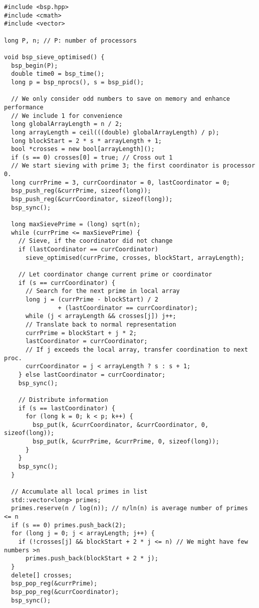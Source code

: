 \documentclass[a4paper,12pt]{article}
\begin{document}
	\begin{lstlisting}[caption={Optimised parallel program for the Sieve of Eratosthenes}, label={prg:par_opt_sieve}, frame={single}]
#include <bsp.hpp>
#include <cmath>
#include <vector>

long P, n; // P: number of processors

void bsp_sieve_optimised() {
  bsp_begin(P);
  double time0 = bsp_time();
  long p = bsp_nprocs(), s = bsp_pid();

  // We only consider odd numbers to save on memory and enhance performance
  // We include 1 for convenience
  long globalArrayLength = n / 2;
  long arrayLength = ceil(((double) globalArrayLength) / p);
  long blockStart = 2 * s * arrayLength + 1;
  bool *crosses = new bool[arrayLength]();
  if (s == 0) crosses[0] = true; // Cross out 1
  // We start sieving with prime 3; the first coordinator is processor 0.
  long currPrime = 3, currCoordinator = 0, lastCoordinator = 0;
  bsp_push_reg(&currPrime, sizeof(long));
  bsp_push_reg(&currCoordinator, sizeof(long));
  bsp_sync();

  long maxSievePrime = (long) sqrt(n);
  while (currPrime <= maxSievePrime) {
    // Sieve, if the coordinator did not change
    if (lastCoordinator == currCoordinator)
      sieve_optimised(currPrime, crosses, blockStart, arrayLength);

    // Let coordinator change current prime or coordinator
    if (s == currCoordinator) {
      // Search for the next prime in local array
      long j = (currPrime - blockStart) / 2
               + (lastCoordinator == currCoordinator);
      while (j < arrayLength && crosses[j]) j++;
      // Translate back to normal representation
      currPrime = blockStart + j * 2;
      lastCoordinator = currCoordinator;
      // If j exceeds the local array, transfer coordination to next proc.
      currCoordinator = j < arrayLength ? s : s + 1;
    } else lastCoordinator = currCoordinator;
    bsp_sync();

    // Distribute information
    if (s == lastCoordinator) {
      for (long k = 0; k < p; k++) {
        bsp_put(k, &currCoordinator, &currCoordinator, 0, sizeof(long));
        bsp_put(k, &currPrime, &currPrime, 0, sizeof(long));
      }
    }
    bsp_sync();
  }

  // Accumulate all local primes in list
  std::vector<long> primes;
  primes.reserve(n / log(n)); // n/ln(n) is average number of primes <= n
  if (s == 0) primes.push_back(2);
  for (long j = 0; j < arrayLength; j++) {
    if (!crosses[j] && blockStart + 2 * j <= n) // We might have few numbers >n
      primes.push_back(blockStart + 2 * j);
  }
  delete[] crosses;
  bsp_pop_reg(&currPrime);
  bsp_pop_reg(&currCoordinator);
  bsp_sync();


\end{lstlisting}
\end{document}
